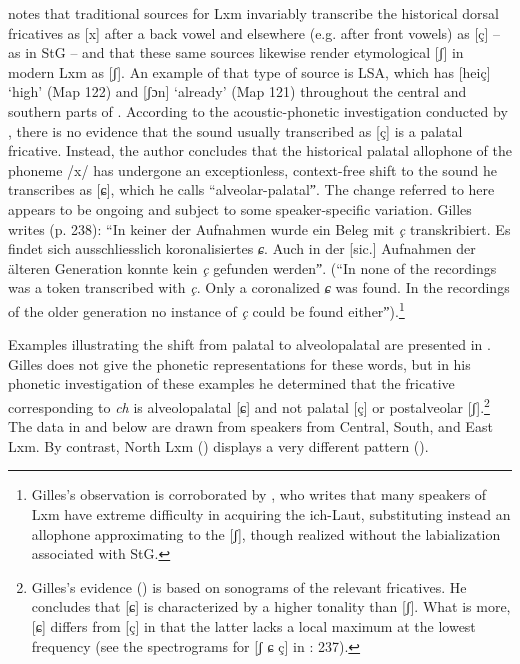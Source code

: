 \begin{xlist}
\citet{Gilles1999} notes that traditional sources for Lxm invariably transcribe the historical dorsal fricatives as [x] after a back vowel and elsewhere (e.g. after front vowels) as [ç] -- as in StG -- and that these same sources likewise render etymological [ʃ] in modern Lxm as [ʃ]. An example of that type of source is LSA, which has [heiç] ‘high’ (Map 122) and [ʃɔn] ‘already’ (Map 121) throughout the central and southern parts of . According to the acoustic-phonetic investigation conducted by \citet{Gilles1999}, there is no evidence that the sound usually transcribed as [ç] is a palatal fricative. Instead, the author concludes that the historical palatal allophone of the phoneme /x/ has undergone an exceptionless, context-free shift to the sound he transcribes as [ɕ], which he calls “alveolar-palatalˮ. The change referred to here appears to be ongoing and subject to some speaker-specific variation. Gilles writes (p. 238): “In keiner der Aufnahmen wurde ein Beleg mit \textit{ç} transkribiert. Es findet sich ausschliesslich koronalisiertes \textit{ɕ}. Auch in der [sic.] Aufnahmen der älteren Generation konnte kein \textit{ç} gefunden werdenˮ. (“In none of the recordings was a token transcribed with \textit{ç}. Only a coronalized \textit{ɕ} was found. In the recordings of the older generation no instance of \textit{ç} could be found eitherˮ).\footnote{Gilles’s observation is corroborated by \citet[636]{Newton1993}, who writes that many speakers of Lxm have extreme difficulty in acquiring the ich-Laut, substituting instead an allophone approximating to the [ʃ], though realized without the labialization associated with StG.}

Examples illustrating the shift from palatal to alveolopalatal are presented in . Gilles does not give the phonetic representations for these words, but in his phonetic investigation of these examples he determined that the fricative corresponding to \textit{ch} is alveolopalatal [ɕ] and not palatal [ç] or postalveolar [ʃ].\footnote{Gilles's evidence (\citeyear[237, 239--241]{Gilles1999}) is based on sonograms of the relevant fricatives. He concludes that [ɕ] is characterized by a higher tonality than [ʃ]. What is more, [ɕ] differs from [ç] in that the latter lacks a local maximum at the lowest frequency (see the spectrograms for [ʃ ɕ ç] in \citealt{Gilles1999}: 237).} The data in  and below are drawn from speakers from Central, South, and East Lxm. By contrast, North Lxm () displays a very different pattern ().


\end{xlist}
